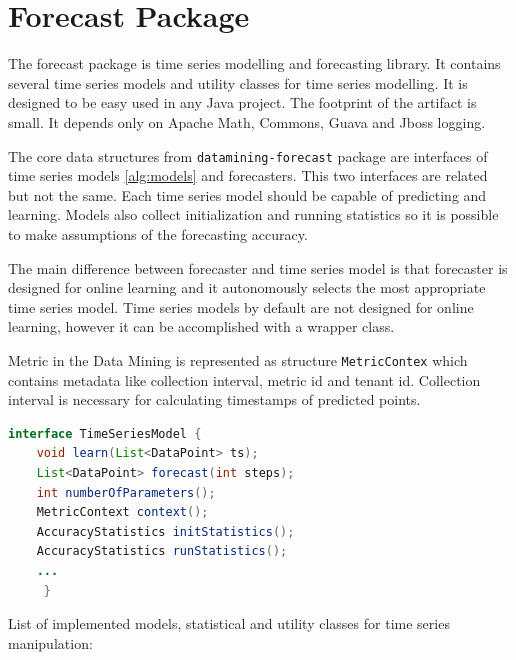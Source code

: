     \section{Forecast Package}
    The forecast package is time series modelling and forecasting library. It contains several time series models
    and utility classes for time series modelling. It is designed to be easy used in any Java project. The footprint
    of the artifact is small. It depends only on Apache Math, Commons, Guava and Jboss logging.

    The core data structures from \texttt{datamining-forecast} package are interfaces of time series models
    \ref{alg:models} and forecasters. This two interfaces are related but not the same. Each time series model should
    be capable of predicting and learning. Models also collect initialization and running statistics so it is possible
    to make assumptions of the forecasting accuracy.

    The main difference between forecaster and time series model is that forecaster is designed for online learning
    and it autonomously selects the most appropriate time series model. Time series models by default are not
    designed for online learning, however it can be accomplished with a wrapper class.

    Metric in the Data Mining is represented as structure \texttt{MetricContex} which contains metadata like
    collection interval, metric id and tenant id. Collection interval is necessary for calculating timestamps of
    predicted points.

    \begin{lstlisting}[caption={Interface for time series models.}, language=Java, label={alg:models}]
interface TimeSeriesModel {
    void learn(List<DataPoint> ts);
    List<DataPoint> forecast(int steps);
    int numberOfParameters();
    MetricContext context();
    AccuracyStatistics initStatistics();
    AccuracyStatistics runStatistics();
    ...
     }
    \end{lstlisting}

    List of implemented models, statistical and utility classes for time series manipulation:

